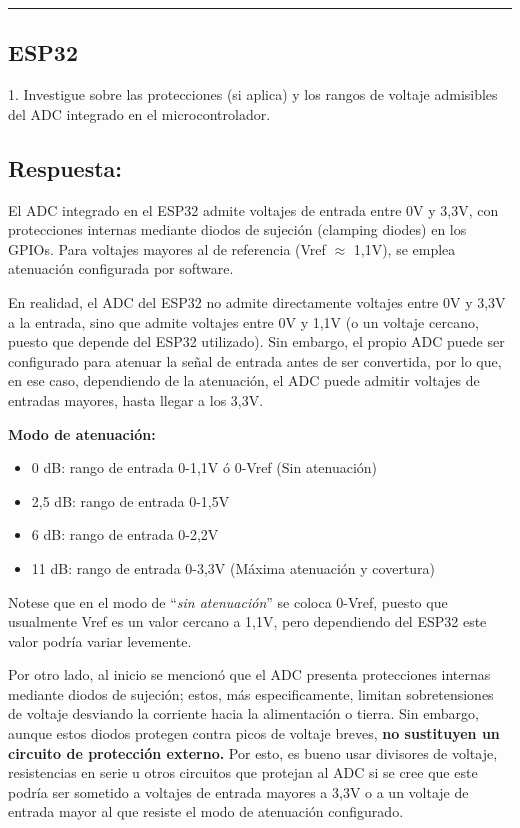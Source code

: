 \documentclass[letterpaper, 12pt]{article}
\begin{document}
\noindent\rule{\textwidth}{0.4pt}

\subsection{ESP32}

1. Investigue sobre las protecciones (si aplica) y los rangos de voltaje admisibles del ADC integrado en el microcontrolador.
\subsection*{\small\textbf{Respuesta:}}
El ADC integrado en el ESP32 admite voltajes de entrada entre 0V y 3,3V, con protecciones internas mediante diodos de sujeción (clamping diodes) en los GPIOs. Para voltajes mayores al de referencia (Vref $\approx$ 1,1V), se emplea atenuación configurada por software.

En realidad, el ADC del ESP32 no admite directamente voltajes entre 0V y 3,3V a la entrada, sino que admite voltajes entre 0V y 1,1V (o un voltaje cercano, puesto que depende del ESP32 utilizado). Sin embargo, el propio ADC puede ser configurado para atenuar la señal de entrada antes de ser convertida, por lo que, en ese caso, dependiendo de la atenuación, el ADC puede admitir voltajes de entradas mayores, hasta llegar a los 3,3V.

{\small\textbf{Modo de atenuación:}}
\begin{itemize}
    \item 0 dB: rango de entrada 0-1,1V ó 0-Vref (Sin atenuación)
    \item 2,5 dB: rango de entrada 0-1,5V
    \item 6 dB: rango de entrada 0-2,2V
    \item 11 dB: rango de entrada 0-3,3V (Máxima atenuación y covertura)
\end{itemize}
Notese que en el modo de ``\textit{sin atenuación}'' se coloca 0-Vref, puesto que usualmente Vref es un valor cercano a 1,1V, pero dependiendo del ESP32 este valor podría variar levemente.

Por otro lado, al inicio se mencionó que el ADC presenta protecciones internas mediante diodos de sujeción; estos, más especificamente, limitan sobretensiones de voltaje desviando la corriente hacia la alimentación o tierra. Sin embargo, aunque estos diodos protegen contra picos de voltaje breves, {\small\textbf{no sustituyen un circuito de protección externo.}} Por esto, es bueno usar divisores de voltaje, resistencias en serie u otros circuitos que protejan al ADC si se cree que este podría ser sometido a voltajes de entrada mayores a 3,3V o a un voltaje de entrada mayor al que resiste el modo de atenuación configurado.
\end{document}

